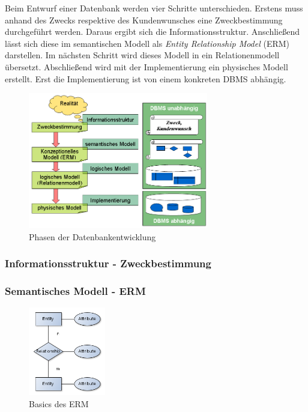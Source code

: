 Beim Entwurf einer Datenbank werden vier Schritte unterschieden. Erstens muss anhand des Zwecks respektive des Kundenwunsches eine Zweckbestimmung durchgeführt werden. Daraus ergibt sich die Informationsstruktur. Anschließend lässt sich diese im semantischen Modell als {\it Entity Relationship Model} (ERM) darstellen. Im nächsten Schritt wird dieses Modell in ein Relationenmodell übersetzt. Abschließend wird mit der Implementierung ein physisches Modell erstellt. Erst die Implementierung ist von einem konkreten DBMS abhängig.

\begin{figure}[h]
	\centering	
	\includegraphics[width=0.7\textwidth]{2jahr_pictures/6lf_oeni_phasen-datenbankentwurf.png}
	\caption{Phasen der Datenbankentwicklung}
	\label{img:6lf_oeni_phasen}
\end{figure}

\subsubsection{Informationsstruktur - Zweckbestimmung}

\subsubsection{Semantisches Modell - ERM}

\begin{figure}
	\begin{center}
		\includegraphics[width=0.30\textwidth]{2jahr_pictures/6lf_oeni_erm-basics.png}
	\end{center}
	\caption{Basics des ERM}
\end{figure}

